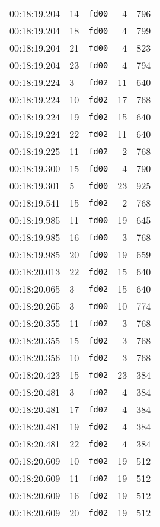 \documentclass{article}
\begin{document}
\begin{longtable}{lllrr}
00:18:19.204 & 14 & \texttt{fd00} & 4 & 796 \\
00:18:19.204 & 18 & \texttt{fd00} & 4 & 799 \\
00:18:19.204 & 21 & \texttt{fd00} & 4 & 823 \\
00:18:19.204 & 23 & \texttt{fd00} & 4 & 794 \\
00:18:19.224 & 3 & \texttt{fd02} & 11 & 640 \\
00:18:19.224 & 10 & \texttt{fd02} & 17 & 768 \\
00:18:19.224 & 19 & \texttt{fd02} & 15 & 640 \\
00:18:19.224 & 22 & \texttt{fd02} & 11 & 640 \\
00:18:19.225 & 11 & \texttt{fd02} & 2 & 768 \\
00:18:19.300 & 15 & \texttt{fd00} & 4 & 790 \\
00:18:19.301 & 5 & \texttt{fd00} & 23 & 925 \\
00:18:19.541 & 15 & \texttt{fd02} & 2 & 768 \\
00:18:19.985 & 11 & \texttt{fd00} & 19 & 645 \\
00:18:19.985 & 16 & \texttt{fd00} & 3 & 768 \\
00:18:19.985 & 20 & \texttt{fd00} & 19 & 659 \\
00:18:20.013 & 22 & \texttt{fd02} & 15 & 640 \\
00:18:20.065 & 3 & \texttt{fd02} & 15 & 640 \\
00:18:20.265 & 3 & \texttt{fd00} & 10 & 774 \\
00:18:20.355 & 11 & \texttt{fd02} & 3 & 768 \\
00:18:20.355 & 15 & \texttt{fd02} & 3 & 768 \\
00:18:20.356 & 10 & \texttt{fd02} & 3 & 768 \\
00:18:20.423 & 15 & \texttt{fd02} & 23 & 384 \\
00:18:20.481 & 3 & \texttt{fd02} & 4 & 384 \\
00:18:20.481 & 17 & \texttt{fd02} & 4 & 384 \\
00:18:20.481 & 19 & \texttt{fd02} & 4 & 384 \\
00:18:20.481 & 22 & \texttt{fd02} & 4 & 384 \\
00:18:20.609 & 10 & \texttt{fd02} & 19 & 512 \\
00:18:20.609 & 11 & \texttt{fd02} & 19 & 512 \\
00:18:20.609 & 16 & \texttt{fd02} & 19 & 512 \\
00:18:20.609 & 20 & \texttt{fd02} & 19 & 512 \\

\end{longtable}
\end{document}

